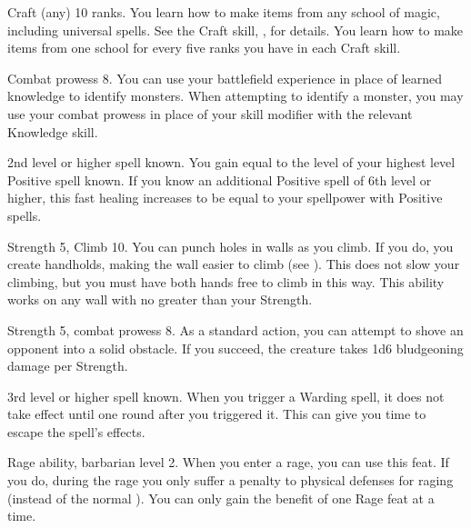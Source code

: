 \featpre Craft (any) 10 ranks.
\featben You learn how to make items from any school of magic, including universal spells.
See the Craft skill, , for details.
You learn how to make items from one school for every five ranks you have in each Craft skill.

\featpre Combat prowess 8.
\featben You can use your battlefield experience in place of learned knowledge to identify monsters.
When attempting to identify a monster, you may use your combat prowess in place of your skill modifier with the relevant Knowledge skill.

\featpre 2nd level or higher  spell known.
\featben You gain  equal to the level of your highest level Positive spell known.
If you know an additional Positive spell of 6th level or higher, this fast healing increases to be equal to your spellpower with Positive spells.

\featpres Strength 5, Climb 10.
\featben You can punch holes in walls as you climb.
If you do, you create handholds, making the wall easier to climb (see ).
This does not slow your climbing, but you must have both hands free to climb in this way.
This ability works on any wall with  no greater than your Strength.

\featpres Strength 5, combat prowess 8.
\featben As a standard action, you can attempt to shove an opponent into a solid obstacle.
If you succeed, the creature takes 1d6 bludgeoning damage per Strength.

\featpre 3rd level or higher  spell known.
\featben When you trigger a Warding spell, it does not take effect until one round after you triggered it. This can give you time to escape the spell's effects.

\featpre Rage ability, barbarian level 2.
\featben When you enter a rage, you can use this feat. If you do, during the rage you only suffer a  penalty to physical defenses for raging (instead of the normal ).
 You can only gain the benefit of one Rage feat at a time.

